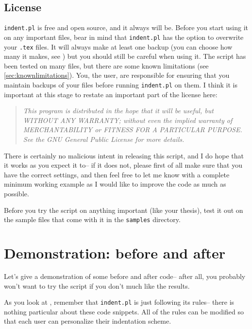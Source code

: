 \subsection{License}
\lstinline!indent.pl! is free and open source, and it always will be.
Before you start using it on any important files, bear in mind that \lstinline!indent.pl! has the option to overwrite your \lstinline!.tex! files.
It will always make at least one backup (you can choose how many it makes, see )
but you should still be careful when using it. The script has been tested on many
files, but there are some known limitations (see \cref{sec:knownlimitations}). 
You, the user, are responsible for ensuring that you maintain backups of your files
before running \lstinline!indent.pl! on them. I think it is important at this
stage to restate an important part of the license here:
\begin{quote}\itshape
	This program is distributed in the hope that it will be useful,
	but WITHOUT ANY WARRANTY; without even the implied warranty of
	MERCHANTABILITY or FITNESS FOR A PARTICULAR PURPOSE.  See the
	GNU General Public License for more details.
\end{quote}
There is certainly no malicious intent in releasing this script, and I do hope
that it works as you expect it to-- if it does not, please first of all 
make sure that you have the correct settings, and then feel free to let me know with a 
complete minimum working example as I would like to improve the code as much as possible. 
 	 	 	 	 	
\begin{warning}
	Before you try the script on anything important (like your thesis), test it 
	out on the sample files that come with it in the \lstinline!samples! directory. 
\end{warning}
 	 	 	 	 
 	 	 	 	 	
\section{Demonstration: before and after}
Let's give a demonstration of some before and after code-- after all, you probably
won't want to try the script if you don't much like the results.
     
As you look at , remember
that \lstinline!indent.pl! is just following its rules-- there is nothing 
particular about these code snippets. All of the rules can be modified 
so that each user can personalize their indentation scheme. 

